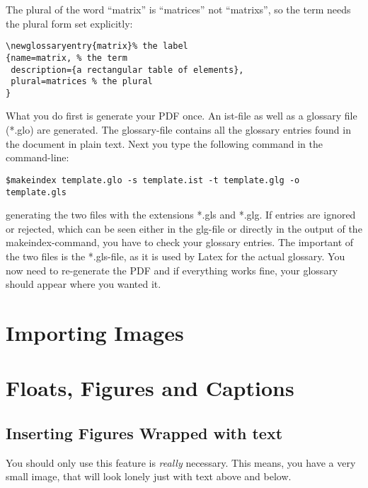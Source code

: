 The plural of the word ``\gls{matrix}'' is ``matrices'' not ``matrixs'', so the term needs the plural form set explicitly:

 \begin{verbatim}
\newglossaryentry{matrix}% the label
{name=matrix, % the term
 description={a rectangular table of elements}, 
 plural=matrices % the plural
}
 \end{verbatim}
 
 What you do first is generate your PDF once. An ist-file as well as a glossary file (*.glo) are generated. The glossary-file contains all the glossary entries found in the document in plain text. Next you type the following command in the command-line:
 
 \begin{verbatim}
$makeindex template.glo -s template.ist -t template.glg -o 
template.gls
 \end{verbatim}

generating the two files with the extensions *.gls and *.glg. If entries are ignored or rejected, which can be seen either in the glg-file or directly in the output of the makeindex-command, you have to check your glossary entries. The important of the two files is the *.gls-file, as it is used by Latex for the actual glossary. You now need to re-generate the PDF and if everything works fine, your glossary should appear where you wanted it.

\section{Importing Images} %
\label{sec:importing_images}


\section{Floats, Figures and Captions} %
\label{sec:floats_figures_and_captions}

 \subsection{Inserting Figures Wrapped with text} %
 \label{ssec:inserting_images_wrapped_with_text}
 
 You should only use this feature is \emph{really} necessary. This means, you have a very small image, that will look lonely just with text above and below.
 
